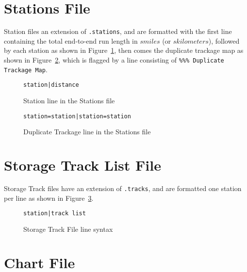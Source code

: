\section{Stations File}

Station files an extension of \verb=.stations=, and are formatted with
the first line containing the total end-to-end run length in $smiles$
(or $skilometers$), followed by each station as shown in
Figure~\ref{fig:stationFileStations}, then comes the duplicate trackage
map as shown in Figure~\ref{fig:stationFileDupTracks}, which is flagged
by a line consisting of \verb=%%% Duplicate Trackage Map=.

\begin{figure}   
\begin{centering}
\verb=station|distance=
\caption{Station line in the Stations file}
\label{fig:stationFileStations}
\end{centering}
\end{figure}

\begin{figure}   
\begin{centering}
\verb"station=station|station=station"
\caption{Duplicate Trackage line in the Stations file}
\label{fig:stationFileDupTracks}
\end{centering}
\end{figure}


\section{Storage Track List File}

Storage Track files have an extension of \verb=.tracks=, and are
formatted one station per line as shown in Figure~\ref{fig:trackfile}.

\begin{figure}
\begin{centering}
\verb=station|track list=\\
\caption{Storage Track File  line syntax}
\label{fig:trackfile}
\end{centering}
\end{figure}


\section{Chart File}

